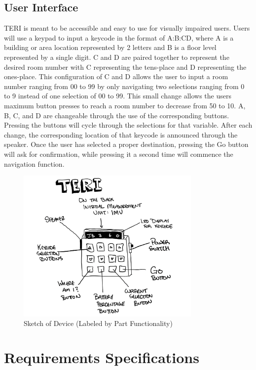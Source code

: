 \documentclass{article}
\begin{document}
\subsection{User Interface}
TERI is meant to be accessible and easy to use for visually impaired users. Users will use a keypad to input a keycode in the format of A:B:CD, where A is a building or area location represented by 2 letters and B is a floor level represented by a single digit. C and D are paired together to represent the desired room number with C representing the tens-place and D representing the ones-place. This configuration of C and D allows the user to input a room number ranging from 00 to 99 by only navigating two selections ranging from 0 to 9 instead of one selection of 00 to 99. This small change allows the users maximum button presses to reach a room number to decrease from 50 to 10. A, B, C, and D are changeable through the use of the corresponding buttons. Pressing the buttons will cycle through the selections for that variable. After each change, the corresponding location of that keycode is announced through the speaker. Once the user has selected a proper destination, pressing the Go button will ask for confirmation, while pressing it a second time will commence the navigation function.

\begin{figure}[h!]
    \centering
    \includegraphics[width=0.8\textwidth]{user_interface_design.png}
    \caption{Sketch of Device (Labeled by Part Functionality)}
    \label{fig:teri_sketch}
\end{figure}

\section{Requirements Specifications}
\end{document}
